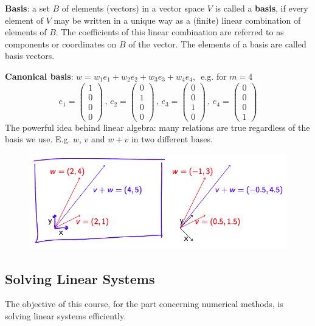 \documentclass[computationalMathematics.tex]{subfiles}
\begin{document}
\begin{definition}
  \textbf{Basis}: a set $B$ of elements (vectors) in a vector space $V$ is called a \textbf{basis}, if every element of $V$ may be written in a unique way as a (finite) linear combination of elements of $B$. The coefficients of this linear combination are referred to as components or coordinates on $B$ of the vector. The elements of a basis are called basis vectors.
\end{definition}
\noindent\textbf{Canonical basis}: $w = w_1e_1 + w_2e_2 + w_3e_3 + w_4e_4, \,$ e.g. for $m = 4$\\
$$  e_1 = \begin{pmatrix} 1\\ 0\\ 0\\ 0 \end{pmatrix}\, , \,
    e_2 = \begin{pmatrix} 0\\ 1\\ 0\\ 0 \end{pmatrix}\, , \,
    e_3 = \begin{pmatrix} 0\\ 0\\ 1\\ 0 \end{pmatrix}\, , \,
    e_4 = \begin{pmatrix} 0\\ 0\\ 0\\ 1 \end{pmatrix}$$
The powerful idea behind linear algebra: many relations are true
regardless of the basis we use. E.g. $w$, $v$ and $w + v$ in two different bases.
\begin{figure}[H]
    \centering
    \includegraphics[scale=0.45]{pics/20sett/3.png}
    \label{fig:20sett1}
\end{figure}

\subsection{Solving Linear Systems}
The objective of this course, for the part concerning numerical methods, is solving linear systems efficiently.
\end{document}
